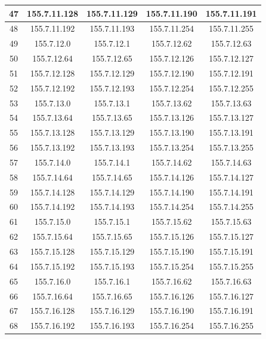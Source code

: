 \documentclass[letterpaper,12pt]{article}
\begin{document}
\begin{longtable}{|c|c|c|c|c|}
        47 & 155.7.11.128 & 155.7.11.129 & 155.7.11.190 & 155.7.11.191 \\ \hline
        48 & 155.7.11.192 & 155.7.11.193 & 155.7.11.254 & 155.7.11.255 \\ \hline
        49 & 155.7.12.0 & 155.7.12.1 & 155.7.12.62 & 155.7.12.63 \\ \hline
        50 & 155.7.12.64 & 155.7.12.65 & 155.7.12.126 & 155.7.12.127 \\ \hline
        51 & 155.7.12.128 & 155.7.12.129 & 155.7.12.190 & 155.7.12.191 \\ \hline
        52 & 155.7.12.192 & 155.7.12.193 & 155.7.12.254 & 155.7.12.255 \\ \hline
        53 & 155.7.13.0 & 155.7.13.1 & 155.7.13.62 & 155.7.13.63 \\ \hline
        54 & 155.7.13.64 & 155.7.13.65 & 155.7.13.126 & 155.7.13.127 \\ \hline
        55 & 155.7.13.128 & 155.7.13.129 & 155.7.13.190 & 155.7.13.191 \\ \hline
        56 & 155.7.13.192 & 155.7.13.193 & 155.7.13.254 & 155.7.13.255 \\ \hline
        57 & 155.7.14.0 & 155.7.14.1 & 155.7.14.62 & 155.7.14.63 \\ \hline
        58 & 155.7.14.64 & 155.7.14.65 & 155.7.14.126 & 155.7.14.127 \\ \hline
        59 & 155.7.14.128 & 155.7.14.129 & 155.7.14.190 & 155.7.14.191 \\ \hline
        60 & 155.7.14.192 & 155.7.14.193 & 155.7.14.254 & 155.7.14.255 \\ \hline
        61 & 155.7.15.0 & 155.7.15.1 & 155.7.15.62 & 155.7.15.63 \\ \hline
        62 & 155.7.15.64 & 155.7.15.65 & 155.7.15.126 & 155.7.15.127 \\ \hline
        63 & 155.7.15.128 & 155.7.15.129 & 155.7.15.190 & 155.7.15.191 \\ \hline
        64 & 155.7.15.192 & 155.7.15.193 & 155.7.15.254 & 155.7.15.255 \\ \hline
        65 & 155.7.16.0 & 155.7.16.1 & 155.7.16.62 & 155.7.16.63 \\ \hline
        66 & 155.7.16.64 & 155.7.16.65 & 155.7.16.126 & 155.7.16.127 \\ \hline
        67 & 155.7.16.128 & 155.7.16.129 & 155.7.16.190 & 155.7.16.191 \\ \hline
        68 & 155.7.16.192 & 155.7.16.193 & 155.7.16.254 & 155.7.16.255 \\ \hline

\end{longtable}
\end{document}
